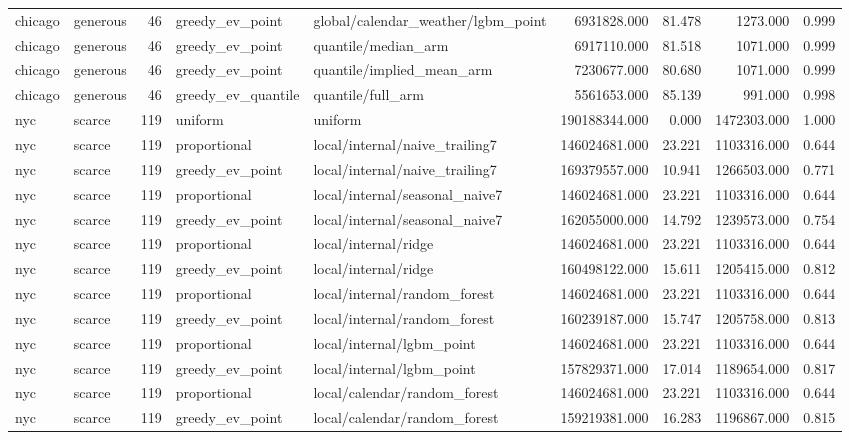 \begin{tabular}{llrllrrrr}
chicago & generous & 46 & greedy\_ev\_point & global/calendar\_weather/lgbm\_point & 6931828.000 & 81.478 & 1273.000 & 0.999 \\
chicago & generous & 46 & greedy\_ev\_point & quantile/median\_arm & 6917110.000 & 81.518 & 1071.000 & 0.999 \\
chicago & generous & 46 & greedy\_ev\_point & quantile/implied\_mean\_arm & 7230677.000 & 80.680 & 1071.000 & 0.999 \\
chicago & generous & 46 & greedy\_ev\_quantile & quantile/full\_arm & 5561653.000 & 85.139 & 991.000 & 0.998 \\
nyc & scarce & 119 & uniform & uniform & 190188344.000 & 0.000 & 1472303.000 & 1.000 \\
nyc & scarce & 119 & proportional & local/internal/naive\_trailing7 & 146024681.000 & 23.221 & 1103316.000 & 0.644 \\
nyc & scarce & 119 & greedy\_ev\_point & local/internal/naive\_trailing7 & 169379557.000 & 10.941 & 1266503.000 & 0.771 \\
nyc & scarce & 119 & proportional & local/internal/seasonal\_naive7 & 146024681.000 & 23.221 & 1103316.000 & 0.644 \\
nyc & scarce & 119 & greedy\_ev\_point & local/internal/seasonal\_naive7 & 162055000.000 & 14.792 & 1239573.000 & 0.754 \\
nyc & scarce & 119 & proportional & local/internal/ridge & 146024681.000 & 23.221 & 1103316.000 & 0.644 \\
nyc & scarce & 119 & greedy\_ev\_point & local/internal/ridge & 160498122.000 & 15.611 & 1205415.000 & 0.812 \\
nyc & scarce & 119 & proportional & local/internal/random\_forest & 146024681.000 & 23.221 & 1103316.000 & 0.644 \\
nyc & scarce & 119 & greedy\_ev\_point & local/internal/random\_forest & 160239187.000 & 15.747 & 1205758.000 & 0.813 \\
nyc & scarce & 119 & proportional & local/internal/lgbm\_point & 146024681.000 & 23.221 & 1103316.000 & 0.644 \\
nyc & scarce & 119 & greedy\_ev\_point & local/internal/lgbm\_point & 157829371.000 & 17.014 & 1189654.000 & 0.817 \\
nyc & scarce & 119 & proportional & local/calendar/random\_forest & 146024681.000 & 23.221 & 1103316.000 & 0.644 \\
nyc & scarce & 119 & greedy\_ev\_point & local/calendar/random\_forest & 159219381.000 & 16.283 & 1196867.000 & 0.815 \\

\end{tabular}
